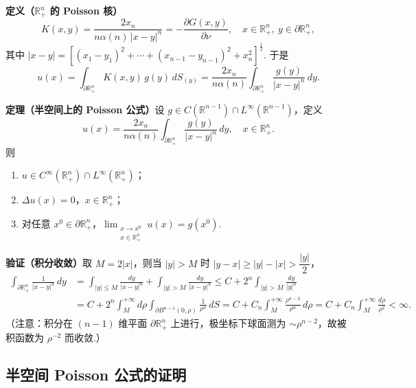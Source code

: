 \documentclass{article}
\begin{document}
\noindent\textbf{定义（$\mathbb{R}^n_+$ 的 Poisson 核）}\quad
\[
K(x,y) = \frac{2x_n}{n\alpha(n)\, |x-y|^n} = -\frac{\partial G(x,y)}{\partial \nu}, \quad x \in \mathbb{R}^n_+,\ y \in \partial \mathbb{R}^n_+,
\]
其中 $|x-y| = \left[ (x_1-y_1)^2 + \cdots + (x_{n-1}-y_{n-1})^2 + x_n^2 \right]^{\frac{1}{2}}$. 于是
\[
u(x) = \int_{\partial \mathbb{R}^n_+} K(x,y)\, g(y)\, dS_{(y)} = \frac{2x_n}{n\alpha(n)} \int_{\partial \mathbb{R}^n_+} \frac{g(y)}{|x-y|^n}\, dy.
\]

\noindent\textbf{定理（半空间上的 Poisson 公式）}\quad 设 $g \in C(\mathbb{R}^{n-1}) \cap L^\infty(\mathbb{R}^{n-1})$，定义
\[
u(x) = \frac{2x_n}{n\alpha(n)} \int_{\partial \mathbb{R}^n_+} \frac{g(y)}{|x-y|^n}\, dy, \quad x \in \mathbb{R}^n_+.
\]
则
\begin{enumerate}[label=\arabic*$^\circ$, left=0pt]
	
	\item $u \in C^\infty(\mathbb{R}^n_+) \cap L^\infty(\mathbb{R}^n_+)$；
	\item $\Delta u(x) = 0$，$x \in \mathbb{R}^n_+$；
	\item 对任意 $x^0 \in \partial \mathbb{R}^n_+$，$\displaystyle\lim_{\substack{x \to x^0 \\ x \in \mathbb{R}^n_+}} u(x) = g(x^0)$.
\end{enumerate}

\noindent\textbf{验证（积分收敛）}\quad 取 $M = 2|x|$，则当 $|y| > M$ 时 $|y-x| \geq |y| - |x| > \dfrac{|y|}{2}$，
\[
\begin{aligned}
	\int_{\partial \mathbb{R}^n_+} \frac{1}{|x-y|^n}\, dy &= \int_{|y| \leq M} \frac{dy}{|x-y|^n} + \int_{|y| > M} \frac{dy}{|x-y|^n} \leq C + 2^n \int_{|y| > M} \frac{dy}{|y|^n} \\
	&= C + 2^n \int_M^{+\infty} d\rho \int_{\partial B^{n-1}(0,\rho)} \frac{1}{\rho^n}\, dS = C + C_n \int_M^{+\infty} \frac{\rho^{n-2}}{\rho^n}\, d\rho = C + C_n \int_M^{+\infty} \frac{d\rho}{\rho^2} < \infty.
\end{aligned}
\]
（注意：积分在 $(n-1)$ 维平面 $\partial \mathbb{R}^n_+$ 上进行，极坐标下球面测为 $\sim \rho^{n-2}$，故被积函数为 $\rho^{-2}$ 而收敛.）

\subsection{半空间 Poisson 公式的证明}
\end{document}
